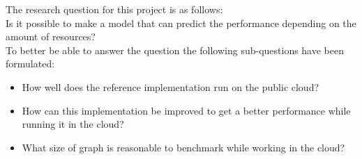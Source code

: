 The research question for this project is as follows: \\
Is it possible to make a model that can predict the performance depending on the amount of resources? \\
To better be able to answer the question the following sub-questions have been formulated: 
\begin{itemize}
\item How well does the reference implementation\cite{graph500-code} run on the public cloud?
\item How can this implementation be improved to get a better performance while running it in the cloud?
\item What size of graph is reasonable to benchmark while working in the cloud?
\end{itemize}